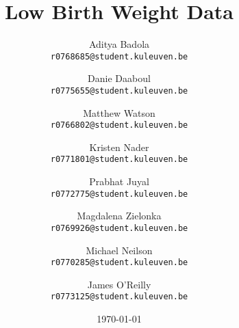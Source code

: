 \documentclass[a4paper,10pt]{article}
\begin{document}
\title{\huge{\textbf{Low Birth Weight Data}}}

\author{
  Aditya Badola\\
  \small\texttt{r0768685@student.kuleuven.be}
  \and
  Danie Daaboul\\
  \small\texttt{r0775655@student.kuleuven.be}
  \and
  Matthew Watson\\
  \small\texttt{r0766802@student.kuleuven.be}
  \and
  Kristen Nader\\
  \small\texttt{r0771801@student.kuleuven.be}
  \and
  Prabhat Juyal\\
  \small\texttt{r0772775@student.kuleuven.be}
  \and
  Magdalena Zielonka\\
  \small\texttt{r0769926@student.kuleuven.be}
  \and
  Michael Neilson\\
  \small\texttt{r0770285@student.kuleuven.be}
  \and
  James O'Reilly\\
  \small\texttt{r0773125@student.kuleuven.be}
}
\date{\today}

\maketitle
\thispagestyle{empty}
\clearpage
{}

\setlength{\parskip}{1.5ex} %
\setlength{\parindent}{0pt}



\newpage



\end{document}
